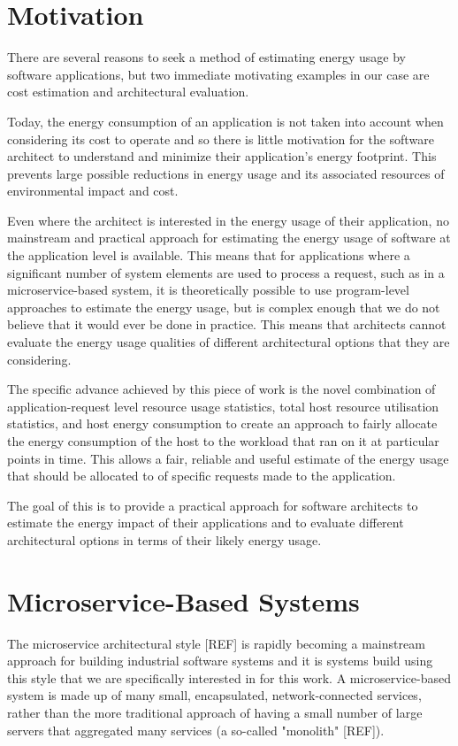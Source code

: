 \section{Motivation}

There are several reasons to seek a method of estimating energy usage by software applications, but two immediate motivating examples in our case are cost estimation and architectural evaluation.

Today, the energy consumption of an application is not taken into account when considering its cost to operate and so there is little motivation for the software architect to understand and minimize their application's energy footprint.  This prevents large possible reductions in energy usage and its associated resources of environmental impact and cost.

Even where the architect is interested in the energy usage of their application, no mainstream and practical approach for estimating the energy usage of software at the application level is available.  This means that for applications where a significant number of system elements are used to process a request, such as in a microservice-based system, it is theoretically possible to use program-level approaches to estimate the energy usage, but is complex enough that we do not believe that it would ever be done in practice.  This means that architects cannot evaluate the energy usage qualities of different architectural options that they are considering.

The specific advance achieved by this piece of work is the novel combination of application-request level resource usage statistics, total host resource utilisation statistics, and host energy consumption to create an approach to fairly allocate the energy consumption of the host to the workload that ran on it at particular points in time.  This allows a fair, reliable and useful estimate of the energy usage that should be allocated to of specific requests made to the application.

The goal of this is to provide a practical approach for software architects to estimate the energy impact of their applications and to evaluate different architectural options in terms of their likely energy usage.

\section{Microservice-Based Systems}

The microservice architectural style [REF] is rapidly becoming a mainstream approach for building industrial software systems and it is systems build using this style that we are specifically interested in for this work.
A microservice-based system is made up of many small, encapsulated, network-connected services, rather than the more traditional approach of having a small number of large servers that aggregated many services (a so-called "monolith" [REF]).

